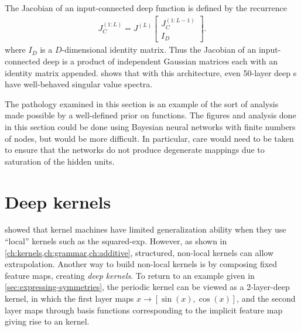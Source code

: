 The Jacobian of an input-connected deep function is defined by the recurrence
%
\newcommand{\sbi}[2]{\left[ \! \begin{array}{c} #1 \\ #2 \end{array} \! \right]} 
\begin{align}
{J_C^{(1:L)} = J^{(L)} \sbi{ J_C^{(1:L-1)}}{I_D}}.
\end{align}
%
%
%
where $I_D$ is a $D$-dimensional identity matrix.
Thus the Jacobian of an input-connected deep \gp{} is a product of independent Gaussian matrices each with an identity matrix appended.
 shows that with this architecture, even 50-layer deep \gp{}s have well-behaved singular value spectra.

The pathology examined in this section is an example of the sort of analysis made possible by a well-defined prior on functions.
The figures and analysis done in this section could be done using Bayesian neural networks with finite numbers of nodes, but would be more difficult.
In particular, care would need to be taken to ensure that the networks do not produce degenerate mappings due to saturation of the hidden units.





\section{Deep kernels}
\label{sec:deep_kernels}

\cite{ bengio2006curse} showed that kernel machines have limited generalization ability when they use ``local'' kernels such as the squared-exp.
However, as shown in \cref{ch:kernels,ch:grammar,ch:additive}, structured, non-local kernels can 
allow extrapolation.
Another way to build non-local kernels is by composing fixed feature maps, creating \emph{deep kernels}.
To return to an example given in \cref{sec:expressing-symmetries}, the periodic kernel can be viewed as a 2-layer-deep kernel, in which the first layer maps $x \rightarrow [\sin(x), \cos(x)]$, and the second layer maps through basis functions corresponding to the implicit feature map giving rise to an \kSE{} kernel.


